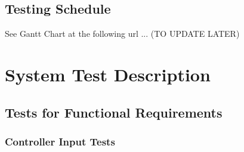 \documentclass[12pt, titlepage]{article}
\begin{document}
	\subsection{Testing Schedule}
	
	See Gantt Chart at the following url ... (TO UPDATE LATER)
	
	\section{System Test Description}
	
	\subsection{Tests for Functional Requirements}
	
	\subsubsection{Controller Input Tests}
\end{document}
